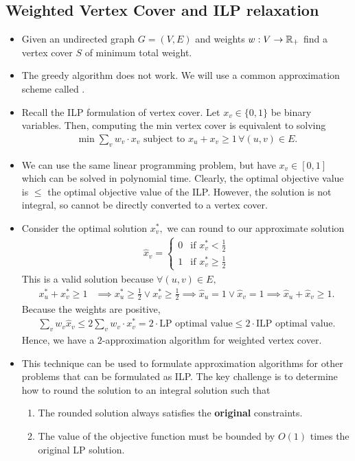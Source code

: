 \documentclass[a4paper,12pt]{article}
\begin{document}
\subsection{Weighted Vertex Cover and ILP relaxation}
\begin{itemize}
    \item Given an undirected graph $G=(V,E)$ and weights $w:V\to\mathbb{R}_+$ find a vertex cover $S$ of minimum total weight.
    \item The greedy algorithm does not work. We will use a common approximation scheme called .
    \item Recall the ILP formulation of vertex cover. Let $x_v\in\{0,1\}$ be binary variables. Then, computing the min vertex cover is equivalent to solving \begin{align}
        \min\sum_vw_v\cdot x_v\text{ subject to }x_u+x_v\geq 1\,\forall(u,v)\in E.
    \end{align}
    \item We can use the same linear programming problem, but have $x_v\in[0,1]$ which can be solved in polynomial time. Clearly, the optimal objective value is $\leq$ the optimal objective value of the ILP. However, the solution is not integral, so cannot be directly converted to a vertex cover.
    \item Consider the optimal solution $x^*_v,$ we can round to our approximate solution \begin{align}
        \hat x_v=\begin{cases}
            0 & \text{if }x^*_v<\frac{1}{2}\\
            1 & \text{if }x^*_v\geq\frac{1}{2}
        \end{cases}
    \end{align}
    This is a valid solution because $\forall(u,v)\in E,$ \begin{align}
        x^*_u+x^*_v\geq 1&\implies x^*_u\geq\frac{1}{2}\lor x^*_v\geq\frac{1}{2}\implies\hat x_u=1\lor\hat x_v=1\implies\hat x_u+\hat x_v\geq 1.
    \end{align}
    Because the weights are positive, \begin{align}
        \sum_vw_v\hat x_v\leq2\sum_vw_v\cdot x_v^*=2\cdot\text{LP optimal value}\leq 2\cdot\text{ILP optimal value}.
    \end{align}
    Hence, we have a $2$-approximation algorithm for weighted vertex cover.
    \item This technique can be used to formulate approximation algorithms for other problems that can be formulated as ILP. The key challenge is to determine how to round the solution to an integral solution such that \begin{enumerate}
        \item The rounded solution always satisfies the \textbf{original} constraints.
        \item The value of the objective function must be bounded by $O(1)$ times the original LP solution.
    \end{enumerate}
\end{itemize}
\end{document}
